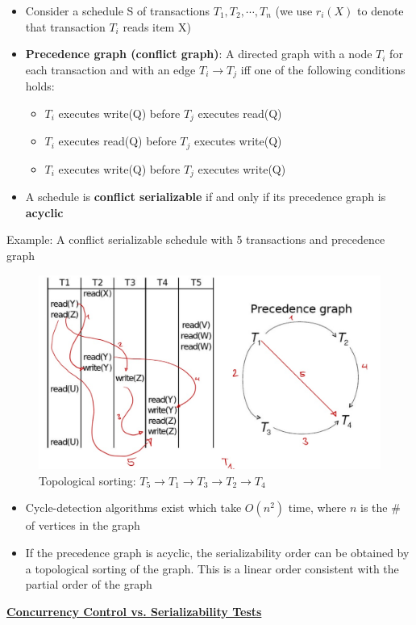 \begin{itemize}[label=\(\rhd\)]
    \item Consider a schedule S of transactions $T_1, T_2, \cdots , T_n$ (we use $r_i(X)$ to denote that transaction $T_i$ reads item X)
    \item \textbf{Precedence graph (conflict graph)}: A directed graph with a node $T_i$ for each transaction and with an edge $T_i \rightarrow T_j$ iff one of the following conditions holds:
    \begin{itemize}[label=\(\rhd\)]
        \item $T_i$ executes write(Q) before $T_j$ executes read(Q)
        \item $T_i$ executes read(Q) before $T_j$ executes write(Q)
        \item $T_i$ executes write(Q) before $T_j$ executes write(Q)
    \end{itemize}
    \item A schedule is \textbf{conflict serializable} if and only if its precedence graph is \textbf{acyclic}
\end{itemize}
Example: A conflict serializable schedule with 5 transactions and precedence graph
\begin{figure}[H]
    \centering
    \includegraphics[width=0.5\linewidth]{images/Screenshot 2024-05-25 at 17.55.43.jpg}
    \caption{Topological sorting: $T_5 \rightarrow T_1 \rightarrow T_3 \rightarrow T_2 \rightarrow T_4$}
\end{figure}
\begin{itemize}[label=\(\rhd\)]
    \item Cycle-detection algorithms exist which take $O(n^2)$ time, where $n$ is the \# of vertices in the graph
    \item If the precedence graph is acyclic, the serializability order can be obtained by a topological sorting of the graph. This is a linear order consistent with the partial order of the graph
\end{itemize}

\bigskip
\textbf{\underline{Concurrency Control vs. Serializability Tests}}\\


